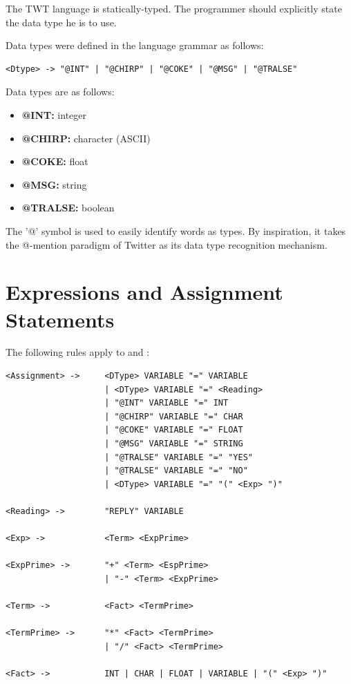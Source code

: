 \documentclass[11pt,a4paper]{report}
\begin{document}
The TWT language is statically-typed. The programmer should explicitly state the
data type he is to use.

Data types were defined in the language grammar as follows:

\begin{lstlisting}
<Dtype> -> "@INT" | "@CHIRP" | "@COKE" | "@MSG" | "@TRALSE"
\end{lstlisting}

Data types are as follows:
\begin{itemize}
  \item \textbf{@INT:} integer
  \item \textbf{@CHIRP:} character (ASCII)
  \item \textbf{@COKE:} float
  \item \textbf{@MSG:} string
  \item \textbf{@TRALSE:} boolean
\end{itemize}

The '@' symbol is used to easily identify words as types. By inspiration, it
takes the @-mention paradigm of Twitter as its data type recognition
mechanism.

\section{Expressions and Assignment Statements}

The following rules apply to  and :
\begin{lstlisting}
<Assignment> -> 	<DType> VARIABLE "=" VARIABLE
                	| <DType> VARIABLE "=" <Reading>
                	| "@INT" VARIABLE "=" INT
                	| "@CHIRP" VARIABLE "=" CHAR
                	| "@COKE" VARIABLE "=" FLOAT
                	| "@MSG" VARIABLE "=" STRING
                	| "@TRALSE" VARIABLE "=" "YES"
                	| "@TRALSE" VARIABLE "=" "NO"
                	| <DType> VARIABLE "=" "(" <Exp> ")"

<Reading> -> 		"REPLY" VARIABLE

<Exp> -> 			<Term> <ExpPrime>

<ExpPrime> ->		"+" <Term> <EspPrime>
            		| "-" <Term> <ExpPrime>
            
<Term> -> 			<Fact> <TermPrime>

<TermPrime> ->		"*" <Fact> <TermPrime>
            		| "/" <Fact> <TermPrime>
            
<Fact> -> 			INT | CHAR | FLOAT | VARIABLE | "(" <Exp> ")"

\end{lstlisting}
\end{document}
